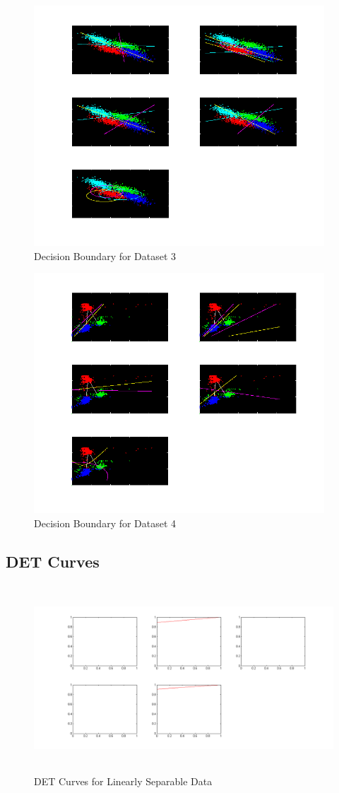 \documentclass[11pt,a4paper]{article}
\begin{document}
\begin{figure}[H]
	\includegraphics[height=9cm]{Figures/OD_DB.png}
	\caption{Decision Boundary for Dataset 3}
\end{figure}

\begin{figure}[H]
	\includegraphics[height=9cm]{Figures/RWD_DB.png}
	\caption{Decision Boundary for Dataset 4}
\end{figure}


\subsection{DET Curves}
\begin{figure}[H]
		\centering
	\includegraphics[height=7cm]{DET/1.png}
	\caption{DET Curves for Linearly Separable Data}
\end{figure}
\end{document}
